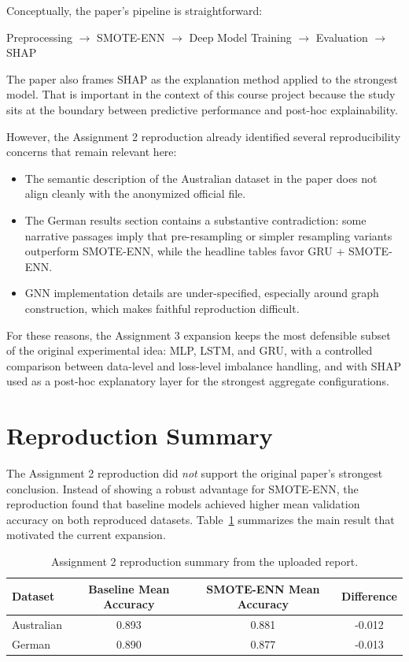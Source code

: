 \documentclass[11pt,a4paper]{article}
\begin{document}
Conceptually, the paper's pipeline is straightforward:
\begin{center}
Preprocessing $\rightarrow$ SMOTE-ENN $\rightarrow$ Deep Model Training $\rightarrow$ Evaluation $\rightarrow$ SHAP
\end{center}
The paper also frames SHAP as the explanation method applied to the strongest model. That is important in the context of this course project because the study sits at the boundary between predictive performance and post-hoc explainability.

However, the Assignment 2 reproduction already identified several reproducibility concerns that remain relevant here:
\begin{itemize}
    \item The semantic description of the Australian dataset in the paper does not align cleanly with the anonymized official file.
    \item The German results section contains a substantive contradiction: some narrative passages imply that pre-resampling or simpler resampling variants outperform SMOTE-ENN, while the headline tables favor GRU + SMOTE-ENN.
    \item GNN implementation details are under-specified, especially around graph construction, which makes faithful reproduction difficult.
\end{itemize}

For these reasons, the Assignment 3 expansion keeps the most defensible subset of the original experimental idea: MLP, LSTM, and GRU, with a controlled comparison between data-level and loss-level imbalance handling, and with SHAP used as a post-hoc explanatory layer for the strongest aggregate configurations.

\section{Reproduction Summary}
The Assignment 2 reproduction did \emph{not} support the original paper's strongest conclusion. Instead of showing a robust advantage for SMOTE-ENN, the reproduction found that baseline models achieved higher mean validation accuracy on both reproduced datasets. Table~\ref{tab:reproduction-summary} summarizes the main result that motivated the current expansion.

\begin{table}[htbp]
\centering
\small
\caption{Assignment 2 reproduction summary from the uploaded report.}
\label{tab:reproduction-summary}
\begin{tabular}{lccc}
\toprule
Dataset & Baseline Mean Accuracy & SMOTE-ENN Mean Accuracy & Difference \\
\midrule
Australian & 0.893 & 0.881 & -0.012 \\
German & 0.890 & 0.877 & -0.013 \\
\bottomrule
\end{tabular}
\end{table}
\end{document}
